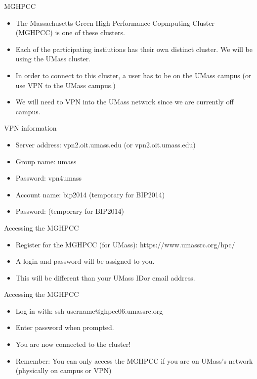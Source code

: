 \begin{frame}{MGHPCC}
\begin{itemize}
\item The Massachusetts Green High Performance Copmputing Cluster (MGHPCC) is one of these clusters.  
\item Each of the participating instiutions has their own distinct cluster. We will be using the UMass cluster.
\item In order to connect to this cluster, a user has to be on the UMass campus (or use VPN to the UMass campus.)
\item We will need to VPN into the UMass network since we are currently off campus.  
\end{itemize}
\end{frame}

\begin{frame}{VPN information}
\begin{itemize}
\item Server address: vpn2.oit.umass.edu (or vpn2.oit.umass.edu)
\item Group name: umass
\item Password: vpn4umass
\item Account name: bip2014 (temporary for BIP2014)
\item Password:  (temporary for BIP2014)
\end{itemize}
\end{frame}

\begin{frame}{Accessing the MGHPCC}
\begin{itemize}
\item Register for the MGHPCC (for UMass): https://www.umassrc.org/hpc/
\item A login and password will be assigned to you. 
\item This will be different than your UMass IDor email address.
\end{itemize}
\end{frame}


\begin{frame}{Accessing the MGHPCC}
\begin{itemize}
\item Log in with: ssh username@ghpcc06.umassrc.org
\item Enter password when prompted.  
\item You are now connected to the cluster!
\item Remember: You can only access the MGHPCC if you are on UMass's network (physically on campus or VPN)
\end{itemize}
\end{frame}

